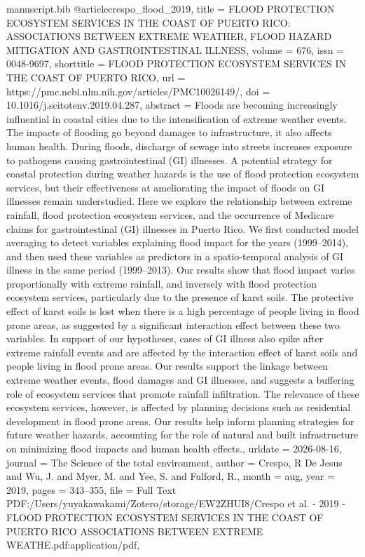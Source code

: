 \begin{filecontents*}[force]{manuscript.bib}
@article{crespo_flood_2019,
	title = {{FLOOD} {PROTECTION} {ECOSYSTEM} {SERVICES} {IN} {THE} {COAST} {OF} {PUERTO} {RICO}: {ASSOCIATIONS} {BETWEEN} {EXTREME} {WEATHER}, {FLOOD} {HAZARD} {MITIGATION} {AND} {GASTROINTESTINAL} {ILLNESS}},
	volume = {676},
	issn = {0048-9697},
	shorttitle = {{FLOOD} {PROTECTION} {ECOSYSTEM} {SERVICES} {IN} {THE} {COAST} {OF} {PUERTO} {RICO}},
	url = {https://pmc.ncbi.nlm.nih.gov/articles/PMC10026149/},
	doi = {10.1016/j.scitotenv.2019.04.287},
	abstract = {Floods are becoming increasingly influential in coastal cities due to the intensification of extreme weather events. The impacts of flooding go beyond damages to infrastructure, it also affects human health. During floods, discharge of sewage into streets increases exposure to pathogens causing gastrointestinal (GI) illnesses. A potential strategy for coastal protection during weather hazards is the use of flood protection ecosystem services, but their effectiveness at ameliorating the impact of floods on GI illnesses remain understudied. Here we explore the relationship between extreme rainfall, flood protection ecosystem services, and the occurrence of Medicare claims for gastrointestinal (GI) illnesses in Puerto Rico. We first conducted model averaging to detect variables explaining flood impact for the years (1999–2014), and then used these variables as predictors in a spatio-temporal analysis of GI illness in the same period (1999–2013). Our results show that flood impact varies proportionally with extreme rainfall, and inversely with flood protection ecosystem services, particularly due to the presence of karst soils. The protective effect of karst soils is lost when there is a high percentage of people living in flood prone areas, as suggested by a significant interaction effect between these two variables. In support of our hypotheses, cases of GI illness also spike after extreme rainfall events and are affected by the interaction effect of karst soils and people living in flood prone areas. Our results support the linkage between extreme weather events, flood damages and GI illnesses, and suggests a buffering role of ecosystem services that promote rainfall infiltration. The relevance of these ecosystem services, however, is affected by planning decisions such as residential development in flood prone areas. Our results help inform planning strategies for future weather hazards, accounting for the role of natural and built infrastructure on minimizing flood impacts and human health effects.},
	urldate = {2026-08-16},
	journal = {The Science of the total environment},
	author = {Crespo, R De Jesus and Wu, J. and Myer, M. and Yee, S. and Fulford, R.},
	month = aug,
	year = {2019},
	pages = {343--355},
	file = {Full Text PDF:/Users/yuyakawakami/Zotero/storage/EW2ZHUI8/Crespo et al. - 2019 - FLOOD PROTECTION ECOSYSTEM SERVICES IN THE COAST OF PUERTO RICO ASSOCIATIONS BETWEEN EXTREME WEATHE.pdf:application/pdf},
}


\end{filecontents*}

